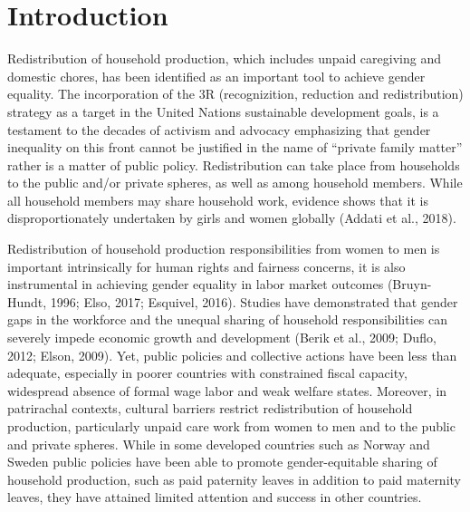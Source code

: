 \documentclass[
  11pt,
]{article}
\begin{document}
\section{Introduction}\label{introduction}

Redistribution of household production, which includes unpaid caregiving
and domestic chores, has been identified as an important tool to achieve
gender equality. The incorporation of the 3R (recognizition, reduction
and redistribution) strategy as a target in the United Nations
sustainable development goals, is a testament to the decades of activism
and advocacy emphasizing that gender inequality on this front cannot be
justified in the name of ``private family matter'' rather is a matter of
public policy. Redistribution can take place from households to the
public and/or private spheres, as well as among household members. While
all household members may share household work, evidence shows that it
is disproportionately undertaken by girls and women globally (Addati et
al., 2018).

Redistribution of household production responsibilities from women to
men is important intrinsically for human rights and fairness concerns,
it is also instrumental in achieving gender equality in labor market
outcomes (Bruyn-Hundt, 1996; Elso, 2017; Esquivel, 2016). Studies have
demonstrated that gender gaps in the workforce and the unequal sharing
of household responsibilities can severely impede economic growth and
development (Berik et al., 2009; Duflo, 2012; Elson, 2009). Yet, public
policies and collective actions have been less than adequate, especially
in poorer countries with constrained fiscal capacity, widespread absence
of formal wage labor and weak welfare states. Moreover, in patrirachal
contexts, cultural barriers restrict redistribution of household
production, particularly unpaid care work from women to men and to the
public and private spheres. While in some developed countries such as
Norway and Sweden public policies have been able to promote
gender-equitable sharing of household production, such as paid paternity
leaves in addition to paid maternity leaves, they have attained limited
attention and success in other countries.
\end{document}
